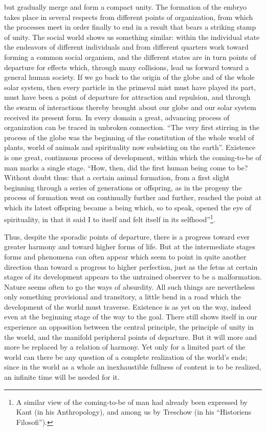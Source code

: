 \documentclass[12pt,a4paper,openany]{book}
\newcommand{\opage}[1]{\marginnote{\footnotesize\textit{[#1]}}}
\begin{document}
\opage{87}but gradually merge and form a compact unity.
The formation of the embryo takes place in several respects from
different points of organization, from which the processes meet
in order finally to end in a result that bears a striking stamp of
unity. The social world shows us something similar: within the
individual state the endeavors of different individuals and from
different quarters work toward forming a common social organism,
and the different states are in turn points of departure for effects
which, through many collisions, lead us forward toward a
general human society. If we go back to the origin of the globe
and of the whole solar system, then every particle in the
primeval mist must have played its part, must have been a point of departure
for attraction and repulsion, and through the swarm of
interactions thereby brought about our globe and
our solar system received its present form. In every domain
a great, advancing process of organization can be traced in
unbroken connection. ``The very first stirring in the
process of the globe was the beginning of the constitution of the whole
world of plants, world of animals and spirituality now subsisting on the earth''.
Existence is one great, continuous process of development,
within which the coming-to-be of man marks a single
stage. ``How, then, did the first human being come to be?
Without doubt thus: that a certain animal formation, from a first
slight beginning through a series of generations or
offspring, as in the progeny the process of formation
went on continually further and further, reached the point at which its latest
offspring became a being which, so to speak, opened
the eye of spirituality, in that it said I to itself and felt itself
in its selfhood''\footnote{A similar view of the coming-to-be of man had already been
expressed by Kant (in his Anthropology), and among us by Treschow (in his ``Historiens
Filosofi'').}.

Thus, despite the sporadic points of departure, there is a
progress toward ever greater harmony and toward higher forms of life.
But at the intermediate stages forms
and phenomena can often appear which seem to point in quite another direction
than toward a progress to higher perfection, just as
\opage{88}the fetus at certain stages of its development appears to the
untrained observer to be a malformation. Nature seems
often to go the ways of absurdity. All such things are nevertheless only something
provisional and transitory, a little bend in a road
which the development of the world must traverse. Existence
is as yet on the way, indeed even at the beginning stage of the way
to the goal. There still shows itself in our experience an
opposition between the central principle, the principle of unity in the world,
and the manifold peripheral points of departure. But it will
more and more be replaced by a relation of harmony. Yet only for
a limited part of the world can there be any question of a
complete realization of the world's ends; since in
the world as a whole an inexhaustible fullness of content is to be realized,
an infinite time will be needed for it.
\end{document}
